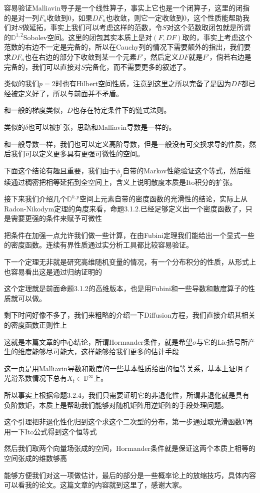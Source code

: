\documentclass[lang=cn,11pt,a4paper,citestyle =authoryear]{elegantpaper}
\begin{document}
容易验证Malliavin导子是一个线性算子，事实上它也是一个闭算子，这里的闭指的是对一列$F_n$收敛到$0$，如果$DF_n$也收敛，则它一定收敛到$0$，这个性质能帮助我们对$S$做延拓，事实上我们可以考虑这样的范数，令$S$对这个范数取闭包就是所谓的$\mathbb{D}^{1,2}$Sobolev空间。这里的闭包其实本质上是对$(F,DF)$取的，事实上考虑这个范数的右边不一定是完备的，所以在Cauchy列的情况下需要额外的指出，我们要求$DF_n$也在右边的部分下收敛到某一个元素$F'$，然后定义$DF$就是$F'$，倘若右边是完备的，我们可以直接对$S$完备化，而不需要更多的叙述了。\par

类似的我们$p=2$时也有Hilbert空间性质，注意到这里之所以完备了是因为$DF$都已经被定义好了，所以与前面并不矛盾。\par

和一般的梯度类似，$D$也存在特定条件下的链式法则。\par

类似的$\delta$也可以被扩张，思路和Malliavin导数是一样的。\par

和一般导数一样，我们也可以定义高阶导数，但是一般没有可交换求导的性质，然后我们可以定义更多具有更强可微性的空间。\par

下面这个结论有趣且重要，我们由于$\phi_j$自带的Markov性能验证这个等式，然后继续通过稠密把相等延拓到全空间上，含义上说明散度本质是Ito积分的扩张。\par

接下来我们介绍几个$\mathbb{D}^{k,p}$空间上元素自带的密度函数的光滑性的结论，实际上从Radon-Nikodym定理的角度来看，命题3.1.2.已经足够定义出一个密度函数了，只是需要更强的条件来赋予可微性\par
把条件在加强一点允许我们做一些计算，在由Fubini定理我们能给出一个显式一些的密度函数。连续有界性质通过实分析工具都比较容易验证。\par

下一个定理无非就是研究高维随机变量的情况，有一个分布积分的性质，从形式上也容易看出这是通过归纳证明的\par
这个定理就是前面命题3.1.2的高维版本，也是用Fubini和一些导数和散度算子的性质就可以做。\par
剩下时间好像不多了，我们来粗略的介绍一下Diffusion方程，我们直接介绍其相关的密度函数正则性上\par
这就是本篇文章的中心结论，所谓Hormander条件，就是希望$\sigma$与它的Lie括号所产生的维度能够尽可能大，这样能够给我们更多的估计手段\par
这一页是用Malliavin导数和散度的一些基本性质给出的恒等关系，基本上证明了光滑系数情况下总有$X_t\in \mathbb{D}^{\infty}$上。\par
所以事实上根据命题3.2.4，我们只需要证明它的非退化性，所谓非退化就是具有负阶数矩，本质上是帮助我们能够对随机矩阵用逆矩阵的手段处理问题。\par
这个引理把非退化性化归到这个求这个二次型的分布，第一步通过取光滑函数$V$再用一下Ito公式得到这个恒等式\par
然后我们取两个向量场张成的空间，Hormander条件就是保证这两个本质上相等的空间张成的维数够高\par
能够方便我们对这一项做估计，最后的部分是一些概率论上的放缩技巧，具体内容可以看我的论文。这篇文章的内容就到这里了，感谢大家。
\end{document}
